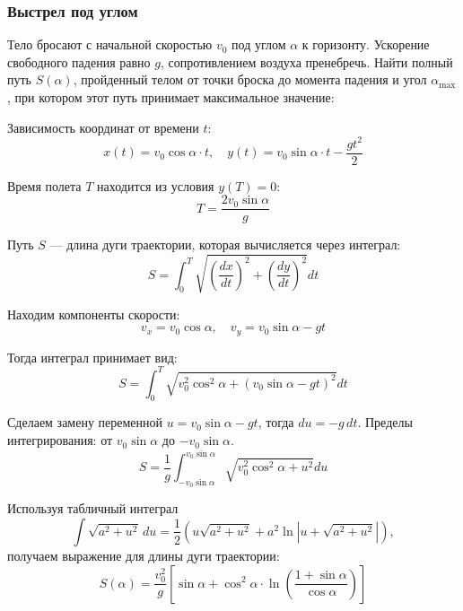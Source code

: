 \subsubsection{Выстрел под углом}

Тело бросают с начальной скоростью \( v_0 \) под углом \( \alpha \) к горизонту. Ускорение свободного падения равно \( g \), сопротивлением воздуха пренебречь.
Найти полный путь \( S(\alpha) \), пройденный телом от точки броска до момента падения и угол \( \alpha_{\max} \), при котором этот путь принимает максимальное значение:

\begin{center}
\end{center}

Зависимость координат от времени $t$:
\[ x(t) = v_0 \cos \alpha \cdot t, \quad y(t) = v_0 \sin \alpha \cdot t - \frac{gt^2}{2} \]

Время полета $T$ находится из условия $y(T) = 0$:
\[ T = \frac{2v_0 \sin \alpha}{g} \]

Путь $S$ --- длина дуги траектории, которая вычисляется через интеграл:
\[ S = \int_0^T \sqrt{\left(\frac{dx}{dt}\right)^2 + \left(\frac{dy}{dt}\right)^2} dt \]

Находим компоненты скорости:
\[ v_x = v_0 \cos \alpha, \quad v_y = v_0 \sin \alpha - gt \]

Тогда интеграл принимает вид:
\[ S = \int_0^{T} \sqrt{v_0^2 \cos^2 \alpha + (v_0 \sin \alpha - gt)^2} dt \]

Сделаем замену переменной $u = v_0 \sin \alpha - gt$, тогда $du = -g \, dt$. Пределы интегрирования: от $v_0 \sin \alpha$ до $-v_0 \sin \alpha$.
\[ S = \frac{1}{g} \int_{-v_0 \sin \alpha}^{v_0 \sin \alpha} \sqrt{v_0^2 \cos^2 \alpha + u^2} du \]

Используя табличный интеграл 
\[
\int \sqrt{a^2 + u^2}\, du = \frac{1}{2} \left( u\sqrt{a^2+u^2} + a^2 \ln|u + \sqrt{a^2+u^2}| \right),
\]
получаем выражение для длины дуги траектории:
\[
\boxed{S(\alpha) = \frac{v_0^2}{g} \left[ \sin \alpha + \cos^2 \alpha \cdot \ln \left( \frac{1 + \sin \alpha}{\cos \alpha} \right) \right]}
\]

